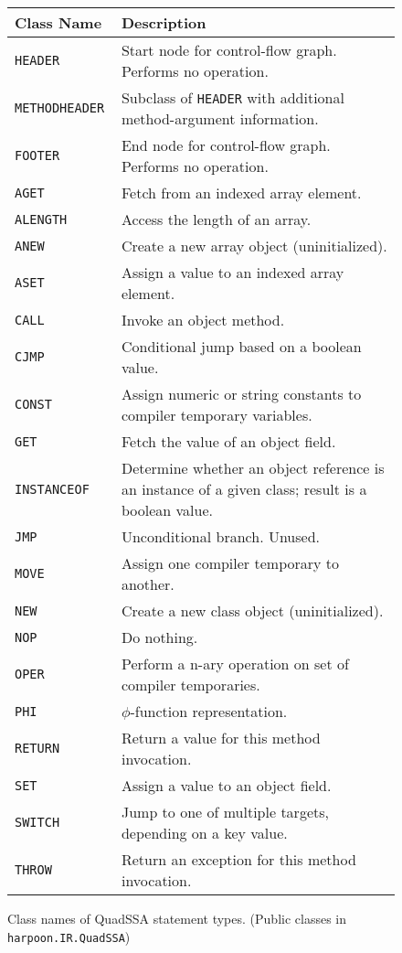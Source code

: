 \documentclass[11pt,notitlepage,twocolumn,twoside]{article}
\newcommand{\phifunction}{$\phi$-function}
\begin{document}
\begin{figure*}[!p]
\begin{tabular}{p{1.25in}p{4.5in}} 
\small\bf Class Name & \small\bf Description \\ \hline
\tt HEADER & Start node for control-flow graph.  Performs no operation.\\
\tt METHODHEADER & Subclass of \texttt{HEADER} with additional 
                   method-argument information.\\
\tt FOOTER & End node for control-flow graph.  Performs no operation.\\ \hline
\tt AGET & Fetch from an indexed array element.\\
\tt ALENGTH & Access the length of an array. \\
\tt ANEW & Create a new array object (uninitialized). \\
\tt ASET & Assign a value to an indexed array element. \\
\tt CALL & Invoke an object method. \\
\tt CJMP & Conditional jump based on a boolean value. \\
\tt CONST & Assign numeric or string constants to 
            compiler temporary variables. \\
\tt GET & Fetch the value of an object field. \\
\tt INSTANCEOF & Determine whether an object reference is an instance of a
                 given class; result is a boolean value. \\
\tt JMP & Unconditional branch.  Unused. \\
\tt MOVE & Assign one compiler temporary to another. \\
\tt NEW  & Create a new class object (uninitialized). \\
\tt NOP  & Do nothing. \\
\tt OPER & Perform a n-ary operation on set of compiler temporaries.\\
\tt PHI  & \phifunction{} representation.\\
\tt RETURN & Return a value for this method invocation.\\
\tt SET  & Assign a value to an object field. \\
\tt SWITCH & Jump to one of multiple targets, depending on a key value. \\
\tt THROW & Return an exception for this method invocation. \\
\hline
\end{tabular}
\caption{Class names of QuadSSA statement types.
\small (Public classes in \texttt{harpoon.IR.QuadSSA})}
\label{fig:quads}
\end{figure*}
\end{document}
